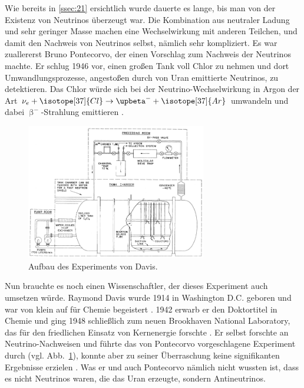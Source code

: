 \documentclass[a4paper,12pt]{article}
\newcommand{\figref}[1]{Abb.~\ref{#1}}
\begin{document}
Wie bereits in \cref{ssec:21} ersichtlich wurde dauerte es lange, bis man von der Existenz von Neutrinos überzeugt war. Die Kombination aus neutraler Ladung und sehr geringer Masse machen eine Wechselwirkung mit anderen Teilchen, und damit den Nachweis von Neutrinos selbst, nämlich sehr kompliziert. Es war zuallererst Bruno Pontecorvo, der einen Vorschlag zum Nachweis der Neutrinos machte. Er schlug 1946 vor, einen großen Tank voll Chlor zu nehmen und dort Umwandlungsprozesse, angestoßen durch von Uran emittierte Neutrinos, zu detektieren. Das Chlor würde sich bei der Neutrino-Wechselwirkung in Argon der Art $\mathrm{\nu}_e+ \isotope[37]{Cl} \rightarrow \upbeta^- + \isotope[37]{Ar}$ \cite[697]{Kolanoski2016} umwandeln und dabei $\upbeta^-$-Strahlung emittieren \cite[1--5]{Pontecorvo1946}.
\begin{figure}[b!]
\centering
\includegraphics[width=0.7\textwidth]{Davis_Aufbau}
\caption[Aufbau des Experiments von Davis. -- Quelle: {\cite[][1206]{Davis1968}}]{Aufbau des Experiments von Davis.}
\label{fig:davis}
\end{figure} \par
Nun brauchte es noch einen Wissenschaftler, der dieses Experiment auch umsetzen würde. Raymond Davis wurde 1914 in Washington D.C. geboren und war von klein auf für Chemie begeistert \cite[22]{Lande2009}. 1942 erwarb er den Doktortitel in Chemie und ging 1948 schließlich zum neuen Brookhaven National Laboratory, das für den friedlichen Einsatz von Kernenergie forschte \cite{NPO}. Er selbst forschte an Neutrino-Nachweisen und führte das von Pontecorvo vorgeschlagene Experiment durch (vgl. \figref{fig:davis}), konnte aber zu seiner Überraschung keine signifikanten Ergebnisse erzielen \cite{NPO}.
Was er und auch Pontecorvo nämlich nicht wussten ist, dass es nicht Neutrinos waren, die das Uran erzeugte, sondern Antineutrinos. \par
\end{document}
